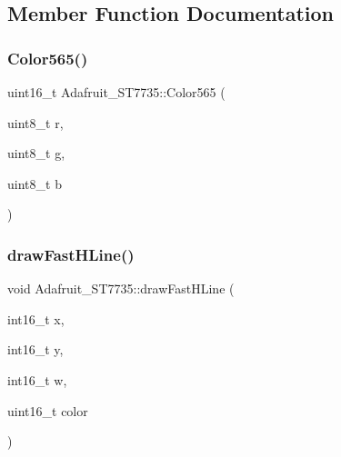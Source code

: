 \subsection{Member Function Documentation}
\mbox{\label{class_adafruit___s_t7735_aef9c4f90acb18082a51b18490feb3c0b}} 
\subsubsection{\texorpdfstring{Color565()}{Color565()}}
{\footnotesize\ttfamily uint16\+\_\+t Adafruit\+\_\+\+S\+T7735\+::\+Color565 (\begin{DoxyParamCaption}\item[{uint8\+\_\+t}]{r,  }\item[{uint8\+\_\+t}]{g,  }\item[{uint8\+\_\+t}]{b }\end{DoxyParamCaption})}

\mbox{\label{class_adafruit___s_t7735_ab2b8eb320bd19305c09b35be6d55d37e}} 
\subsubsection{\texorpdfstring{draw\+Fast\+H\+Line()}{drawFastHLine()}}
{\footnotesize\ttfamily void Adafruit\+\_\+\+S\+T7735\+::draw\+Fast\+H\+Line (\begin{DoxyParamCaption}\item[{int16\+\_\+t}]{x,  }\item[{int16\+\_\+t}]{y,  }\item[{int16\+\_\+t}]{w,  }\item[{uint16\+\_\+t}]{color }\end{DoxyParamCaption})}

